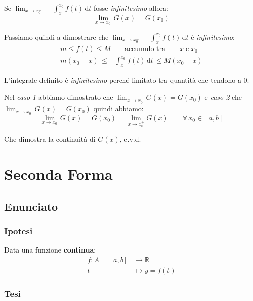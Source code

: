 \documentclass[../../dimostrazioni]{subfiles}
\begin{document}
                    Se \( \lim_{x \to x_0^-} - \int_x^{x_0} \! f(t) \, \mathrm{d}t \) fosse \emph{infinitesimo} allora:
                    \[  \lim_{x \to x_0^-}G(x) = G(x_0) \]

                    Passiamo quindi a dimostrare che \( \lim_{x \to x_0^-} - \int_x^{x_0} \! f(t) \, \mathrm{d}t \) è \emph{infinitesimo}:
                    \begin{gather*}
                        m \leqslant f(t) \leqslant M \qquad \text {accumulo tra} \qquad x \; \text{e} \; x_0\\
                        m(x_0-x) \, \leqslant - \int_x^{x_0} \! f(t) \, \mathrm{d}t \, \leqslant M(x_0-x)
                    \end{gather*}

                    L'integrale definito è \emph{infinitesimo} perché limitato tra quantità che tendono a 0.

                    Nel \emph{caso 1} abbiamo dimostrato che \(  \lim_{x \to x_0^+}G(x) = G(x_0) \) e \emph{caso 2} che \(  \lim_{x \to x_0^-}G(x) = G(x_0) \) quindi abbiamo:
                    \[  \lim_{x \to x_0^-}G(x) = G(x_0) = \lim_{x \to x_0^+}G(x) \qquad \forall \, x_0 \in [a, b] \]

                    Che dimostra la continuità di \(G(x)\), c.v.d.
            
            \section*{Seconda Forma}

                \subsection*{Enunciato}

                    \subsubsection*{Ipotesi}

                        Data una funzione \textbf{continua}:
                        \begin{align*}
                            f : A = [a, b] &\longrightarrow \mathbb{R}\\
                            t &\longmapsto y = f(t) 
                        \end{align*}

                    \subsubsection*{Tesi}
                    
\end{document}
